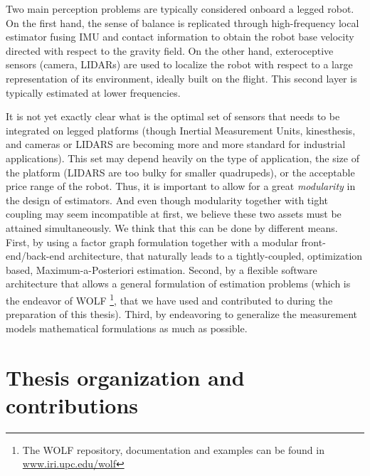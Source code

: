 Two main perception problems are typically considered onboard a legged robot. On the first hand, the sense of balance is replicated through high-frequency
local estimator fusing IMU and contact information to obtain the robot base velocity directed with respect to the gravity field. On the other hand,
exteroceptive sensors (camera, LIDARs) are used to localize the robot with respect to a large representation of its environment, ideally built on the flight.
This second layer is typically estimated at lower frequencies.

It is not yet exactly clear what is the optimal set of sensors that needs to be integrated on legged platforms (though Inertial Measurement Units, kinesthesis, and 
cameras or LIDARS are becoming more and more standard for industrial applications). This set may depend heavily on the type of application,
the size of the platform (LIDARS are too bulky for smaller quadrupeds), or the acceptable price range of the robot. Thus, it is important to allow
for a great \textit{modularity} in the design of estimators.
And even though modularity together with tight coupling may seem incompatible at first, we believe these two assets must be attained simultaneously.
We think that this can be done by different means. 
First, by using a factor graph formulation together with a modular front-end/back-end architecture, that naturally leads to a tightly-coupled, optimization based, Maximum-a-Posteriori estimation.
Second, by a flexible software architecture
that allows a general formulation of estimation problems (which is the endeavor of WOLF \cite{sola2021wolf}\footnote{The WOLF repository, documentation and examples can be 
found in \url{www.iri.upc.edu/wolf}}, that we have used and contributed to during the preparation of this thesis). Third, by endeavoring to generalize the measurement models mathematical formulations as much as possible. 
 




\section{Thesis organization and contributions}

